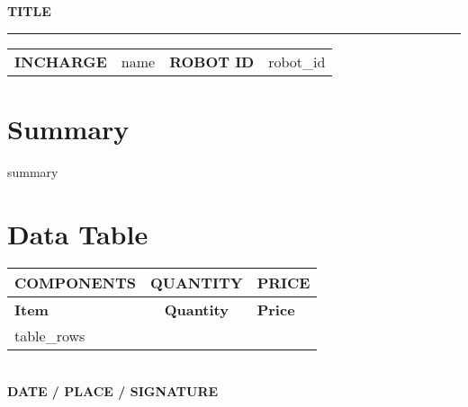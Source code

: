 \documentclass[10pt]{article}
\begin{document}

\thispagestyle{firstpage}

\begin{flushright}
    \texttt{[image:  \{\{logo\_path]}} }
\end{flushright}

\vspace{-3.5em}

\begin{center}
    {\Huge \textcolor{primary_color}{\textbf{\MakeUppercase{ {{title}} }}}} \\[0.3em]
    \textcolor{lightgray}{\rule{\textwidth}{1pt}} %
\end{center}

\vspace{1cm}

\noindent
\begin{tabularx}{\textwidth}{>{\raggedright\arraybackslash}p{3cm} X >{\raggedright\arraybackslash}p{3cm} X}
  \textbf{\textcolor{primary_color}{INCHARGE}} & {{name}} &
  \textbf{\textcolor{primary_color}{ROBOT ID}} & {{robot_id}} \\
\end{tabularx}

\vspace{1cm}

\section*{Summary}

\noindent
{{summary}}


\section*{Data Table}

\begin{tabularx}{\textwidth}{p{11cm}|c|X}
  \rowcolor{gray!35}
  \textbf{\textcolor{primary_color}{COMPONENTS}} 
  & \textbf{\textcolor{primary_color}{QUANTITY}} 
  & \textbf{\textcolor{primary_color}{PRICE}} \\
  \hline
  \endfirsthead

  \rowcolor{gray!35}
  \textbf{\textcolor{primary_color}{Item}} & \textbf{\textcolor{primary_color}{Quantity}} & \textbf{\textcolor{primary_color}{Price}} \\
  \hline
  \endhead

  \endfoot

  \endlastfoot

  {{table_rows}}
\end{tabularx}


\vspace{2cm}  

\noindent
\begin{minipage}[t]{0.35\textwidth}
  \hrulefill  
\end{minipage}
\\
\vspace{1cm}
\small{\textbf{DATE / PLACE / SIGNATURE}}
\end{document}
